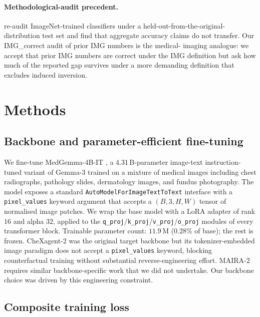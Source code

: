 \documentclass{article}
\begin{document}
\paragraph{Methodological-audit precedent.} \citet{recht2019imagenet}
re-audit ImageNet-trained classifiers under a held-out-from-the-original-
distribution test set and find that aggregate accuracy claims do not
transfer. Our IMG\_correct audit of prior IMG numbers is the medical-
imaging analogue: we accept that prior IMG numbers are correct under the
IMG definition but ask how much of the reported gap survives under a
more demanding definition that excludes induced inversion.

\section{Methods}
\label{sec:methods}

\subsection{Backbone and parameter-efficient fine-tuning}
\label{sec:backbone}

We fine-tune MedGemma-4B-IT \citep{google2024medgemma}, a 4.31\,B-parameter
image-text instruction-tuned variant of Gemma-3 trained on a mixture of
medical images including chest radiographs, pathology slides, dermatology
images, and fundus photography. The model exposes a standard
\texttt{AutoModelForImageTextToText} interface with a \texttt{pixel\_values}
keyword argument that accepts a $(B, 3, H, W)$ tensor of normalised image
patches. We wrap the base model with a LoRA adapter \citep{hu2022lora} of
rank $16$ and alpha $32$, applied to the
\texttt{q\_proj}/\texttt{k\_proj}/\texttt{v\_proj}/\texttt{o\_proj} modules
of every transformer block. Trainable parameter count: $11.9$\,M ($0.28\%$
of base); the rest is frozen. CheXagent-2 \citep{chen2024chexagent} was the
original target backbone but its tokenizer-embedded image paradigm does
not accept a \texttt{pixel\_values} keyword, blocking counterfactual
training without substantial reverse-engineering effort. MAIRA-2
\citep{bannur2024maira2} requires similar backbone-specific work that we
did not undertake. Our backbone choice was driven by this engineering
constraint.

\subsection{Composite training loss}
\label{sec:loss}
\end{document}
